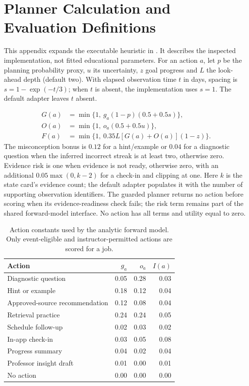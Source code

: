 \clearpage
\section{Planner Calculation and Evaluation Definitions}
\label{sec:planner-math}
This appendix expands the executable heuristic in
.
It describes the inspected implementation, not fitted educational parameters.
For an action $a$, let $p$ be the planning probability proxy, $u$ its uncertainty,
$z$ goal progress and $L$ the look-ahead depth (default two). With elapsed
observation time $t$ in days, spacing is $s=1-\exp(-t/3)$; when $t$ is absent,
the implementation uses $s=1$. The default adapter leaves $t$ absent.

\begin{align}
G(a)&=\min\{1,\ g_a(1-p)(0.5+0.5s)\},\\
O(a)&=\min\{1,\ o_a(0.5+0.5u)\},\\
F(a)&=\min\{1,\ 0.35L[G(a)+O(a)](1-z)\}.
\end{align}
The misconception bonus is $0.12$ for a hint/example or $0.04$ for a diagnostic
question when the inferred incorrect streak is at least two, otherwise zero.
Evidence risk is one when evidence is not ready, otherwise zero, with an
additional $0.05\max(0,k-2)$ for a check-in and clipping at one. Here $k$ is
the state card's evidence count; the default adapter populates it with the
number of supporting observation identifiers. The guarded
planner returns no action before scoring when its evidence-readiness check
fails; the risk term remains part of the shared forward-model interface.
No action has all terms and utility equal to zero.

\begin{table}[htbp]
\centering\small
\caption{Action constants used by the analytic forward model. Only
event-eligible and instructor-permitted actions are scored for a job.}
\begin{tabularx}{\linewidth}{@{}Yrrr@{}}
\toprule Action & $g_a$ & $o_a$ & $I(a)$ \\\midrule
Diagnostic question & 0.05 & 0.28 & 0.03 \\
Hint or example & 0.18 & 0.12 & 0.04 \\
Approved-source recommendation & 0.12 & 0.08 & 0.04 \\
Retrieval practice & 0.24 & 0.24 & 0.05 \\
Schedule follow-up & 0.02 & 0.03 & 0.02 \\
In-app check-in & 0.03 & 0.05 & 0.08 \\
Progress summary & 0.04 & 0.02 & 0.04 \\
Professor insight draft & 0.01 & 0.00 & 0.01 \\
No action & 0.00 & 0.00 & 0.00 \\
\bottomrule
\end{tabularx}
\end{table}

